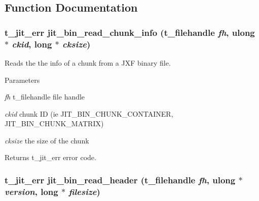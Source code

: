 \subsection{Function Documentation}
\hypertarget{group__binmod_ga8621d6d19ee0e6f5aa1af98002f533c4}{
\subsubsection[{jit\_\-bin\_\-read\_\-chunk\_\-info}]{\setlength{\rightskip}{0pt plus 5cm}t\_\-jit\_\-err jit\_\-bin\_\-read\_\-chunk\_\-info ({\bf t\_\-filehandle} {\em fh}, \/  {\bf ulong} $\ast$ {\em ckid}, \/  long $\ast$ {\em cksize})}}
\label{group__binmod_ga8621d6d19ee0e6f5aa1af98002f533c4}


Reads the the info of a chunk from a JXF binary file. 
\begin{DoxyParams}{Parameters}
\item[{\em fh}]t\_\-filehandle file handle \item[{\em ckid}]chunk ID (ie JIT\_\-BIN\_\-CHUNK\_\-CONTAINER, JIT\_\-BIN\_\-CHUNK\_\-MATRIX) \item[{\em cksize}]the size of the chunk\end{DoxyParams}
\begin{DoxyReturn}{Returns}
t\_\-jit\_\-err error code. 
\end{DoxyReturn}
\hypertarget{group__binmod_gae7d8bcde80fd16666ab01a841f0f23b2}{
\subsubsection[{jit\_\-bin\_\-read\_\-header}]{\setlength{\rightskip}{0pt plus 5cm}t\_\-jit\_\-err jit\_\-bin\_\-read\_\-header ({\bf t\_\-filehandle} {\em fh}, \/  {\bf ulong} $\ast$ {\em version}, \/  long $\ast$ {\em filesize})}}
\label{group__binmod_gae7d8bcde80fd16666ab01a841f0f23b2}


